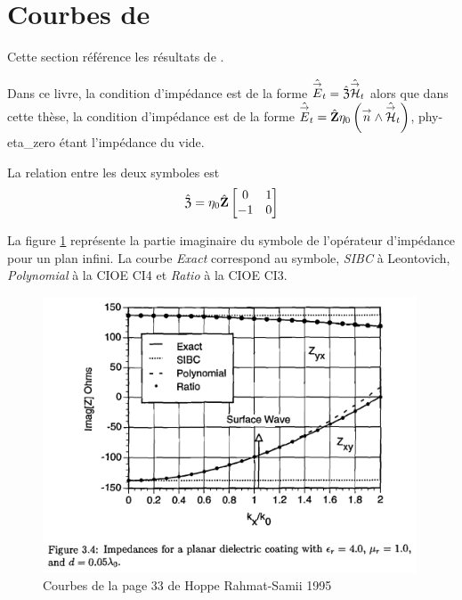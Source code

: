 \section{Courbes de \cite{hoppe_impedance_1995}}

Cette section référence les résultats de \cite{hoppe_impedance_1995}. 


Dans ce livre, la condition d'impédance est de la forme \(\hat{{\overset{\rightarrow}{E}}}_t = \hat{\mathfrak{Z}} \hat{{\overset{\rightarrow}{\mathcal{H}}}}_t\) alors que dans cette thèse, la condition d'impédance est de la forme \(\hat{{\overset{\rightarrow}{E}}}_t = \hat{\mathbf{Z}} \eta_0\left({\overset{\rightarrow}{n}} \wedge \hat{{\overset{\rightarrow}{\mathcal{H}}}}_t\right)\), \gls{phy-eta_zero} étant l'impédance du vide.

La relation entre les deux symboles est
\begin{equation}
  \hat{\mathfrak{Z}} = \eta_0\hat{\mathbf{Z}}\begin{bmatrix}0&1\\-1&0\end{bmatrix}
\end{equation}

La figure \ref{fig:annex:hoppe:p33} représente la partie imaginaire du symbole de l'opérateur d'impédance pour un plan infini. La courbe \textit{Exact} correspond au symbole, \textit{SIBC} à Leontovich, \textit{Polynomial} à la CIOE CI4 et \textit{Ratio} à la CIOE CI3.

\begin{figure}[h!tb]
    \includegraphics[width=0.99\textwidth]{images/hoppe/p33_imp_cylindre.png}
    \caption{Courbes de la page 33 de Hoppe Rahmat-Samii 1995}
    \label{fig:annex:hoppe:p33}
\end{figure}

